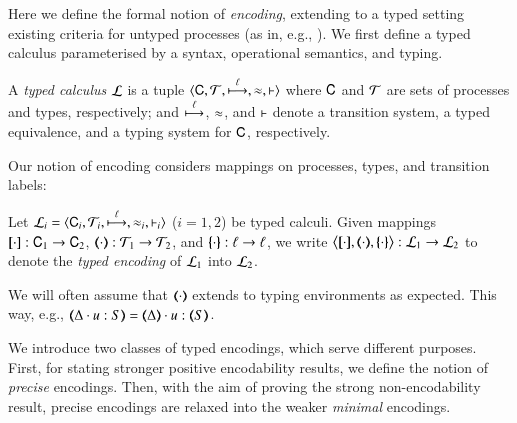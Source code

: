 \noi Here we define the formal notion of \emph{encoding}, 
extending to a typed setting existing criteria for untyped processes (as in, e.g.,
\cite{Nestmann00,Palamidessi03,DBLP:conf/lics/PalamidessiSVV06,DBLP:journals/iandc/Gorla10,DBLP:conf/icalp/LanesePSS10,DBLP:journals/tcs/FuL10}). 
We first define a typed calculus parameterised by a syntax, operational semantics, and typing.

\smallskip 

\begin{definition}\label{d:tcalculus}\rm
A \emph{typed calculus} $\mathcal{L}$ is a tuple
          $\calc{\CAL}{\cal{T}}{\hby{\ell}}{\wb}{\proves}$
	where $\mathsf{C}$ and $\cal{T}$ are sets of processes and types, 
respectively; and $\stackrel{\ell}{\longmapsto}$, $\approx$, and $\vdash$ 
	denote a transition system, a typed equivalence, and a typing system for $\mathsf{C}$, respectively. 
\end{definition}

\smallskip 

\noi 
Our notion of encoding considers mappings on processes, 
types, and transition labels: 

\begin{definition}\rm
\label{def:tenc}
        Let  $\tyl{L}_i=\calc{\CAL_i}{{\cal{T}}_i}{\hby{\ell}}{\wb_i}{\proves_i}$
        ($i=1,2$) be typed calculi. 
	Given mappings $[\!\![\cdot]\!\!]: \mathsf{C}_1 \to \mathsf{C}_2$, 
	$\mapt{\cdot}: {\cal{T}}_1 \to {\cal{T}}_2$, and 
	$\{\!\!\{\cdot\}\!\!\}: \ell \to \ell$, 
	we write 
	$\enco{\map{\cdot}, \mapt{\cdot}, \mapa{\cdot}} : \tyl{L}_1 \to \tyl{L}_2$ to denote the \emph{typed encoding} of $\mathcal{L}_1$ into $\mathcal{L}_2$.
\end{definition}

\smallskip 

\noi We will often assume that  $(\!\!\langle\cdot\rangle\!\!)$ extends to typing
environments as expected. This way, e.g., $\mapt{\Delta \cat u:S} = \mapt{\Delta} \cat u:\mapt{S}$.

We introduce two classes of typed encodings, which 
serve different purposes. 
First, for stating stronger positive encodability results, %
we define the notion of {\em precise} encodings.
Then, 
with the aim of proving the strong non-encodability result, %
precise encodings are relaxed into the weaker {\em minimal} encodings. 

